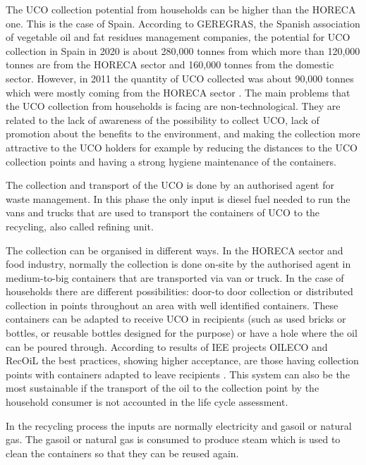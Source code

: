 \documentclass[sustainability,article,submit,moreauthors,pdftex,12pt,a4paper]{mdpi}
\begin{document}
The UCO collection potential from households can be higher than the HORECA one. This is the case of Spain. According to GEREGRAS, the Spanish association of vegetable oil and fat residues management companies, the potential for UCO collection in Spain in 2020 is about 280,000 tonnes from which more than 120,000 tonnes are from the HORECA sector and 160,000 tonnes from the domestic sector. However, in 2011 the quantity of UCO collected was about 90,000 tonnes which were mostly coming from the HORECA sector \cite{IDAEPER}. The main problems that the UCO collection from households is facing are non-technological. They are related to the lack of awareness of the possibility to collect UCO, lack of promotion about the benefits to the environment, and making the collection more attractive to the UCO holders for example by reducing the distances to the UCO collection points and having a strong hygiene maintenance of the containers.
 
The collection and transport of the UCO is done by an authorised agent for waste management. In this phase the only input is diesel fuel needed to run the vans and trucks that are used to transport the containers of UCO to the recycling, also called refining unit.

The collection can be organised in different ways. In the HORECA sector and food industry, normally the collection is done on-site by the authorised agent in medium-to-big containers that are transported via van or truck. In the case of households there are different possibilities: door-to door collection or distributed collection in points throughout an area with well identified containers. These containers can be adapted to receive UCO in recipients (such as used bricks or bottles, or reusable bottles designed for the purpose) or have a hole where the oil can be poured through. According to results of IEE projects OILECO and RecOiL the best practices, showing higher acceptance, are those having collection points with containers adapted to leave recipients \cite{OILECO2013,RecOil2013}. This system can also be the most sustainable if the transport of the oil to the collection point by the household consumer is not accounted in the life cycle assessment.

In the recycling process the inputs are normally electricity and gasoil or natural gas. The gasoil or natural gas is consumed to produce steam which is used to clean the containers so that they can be reused again.
\end{document}
